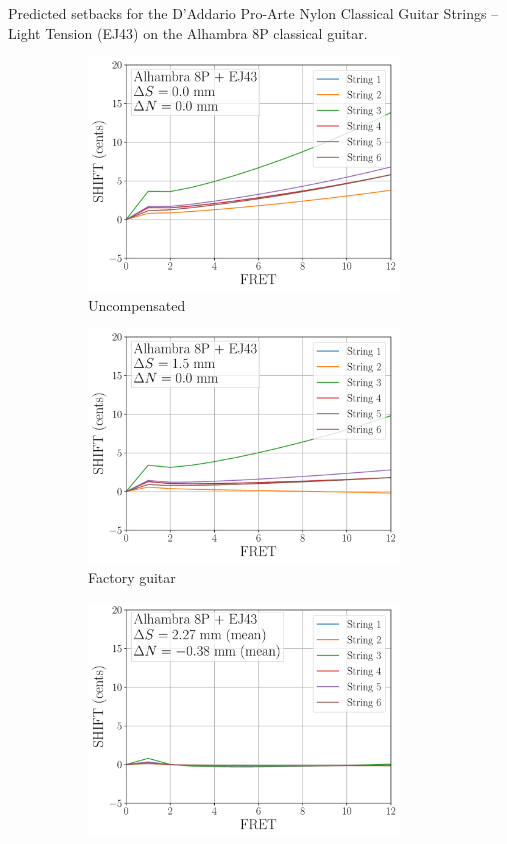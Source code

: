  \begin{table}[htbp]
  \centering
  \caption{\label{tbl:ej43_setbacks} Predicted setbacks for the D'Addario Pro-Arte Nylon Classical Guitar Strings -- Light Tension (EJ43) on the Alhambra 8P classical guitar.}
  
 \end{table}%

 \begin{figure}
  \centering
  \begin{subfigure}[b]{0.45\textwidth}
   \centering
   \includegraphics[width=3.25in]{figures/shift_alhambra8p_ej43_null}
   \caption{Uncompensated}
   \label{fig:shift_alhambra8p_ej43_null}
  \end{subfigure}
  \hspace{0.25in}
  \begin{subfigure}[b]{0.45\textwidth}
   \centering
   \includegraphics[width=3.25in]{figures/shift_alhambra8p_ej43_factory}
   \caption{Factory guitar}
   \label{fig:shift_alhambra8p_ej43_factory}
  \end{subfigure}
  \par\vspace{0.25in}
  \begin{subfigure}[b]{0.45\textwidth}
   \centering
   \includegraphics[width=3.25in]{figures/shift_alhambra8p_ej43_full}

\end{subfigure}
\end{figure}
